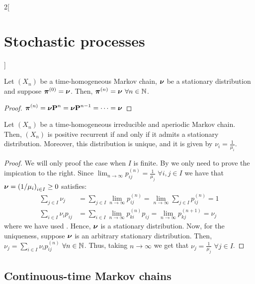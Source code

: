 \documentclass[../../../main_math.tex]{subfiles}
\begin{document}
\begin{multicols}{2}[\section{Stochastic processes}]
\begin{remark}
  \end{remark}
  \begin{lemma}
    Let $(X_n)$ be a time-homogeneous Markov chain, $\boldsymbol{\mathrm{\nu}}$ be a stationary distribution and suppose $\boldsymbol{\mathrm{\pi}}^{(0)}=\boldsymbol{\mathrm{\nu}}$. Then, $\boldsymbol{\mathrm{\pi}}^{(n)}=\boldsymbol{\mathrm{\nu}}$ $\forall n\in\mathbb{N}$.
  \end{lemma}
  \begin{proof}
    $\displaystyle
      \boldsymbol{\mathrm{\pi}}^{(n)}=\boldsymbol{\mathrm{\nu}}\boldsymbol{\mathrm{P}}^n=\boldsymbol{\mathrm{\nu}}\boldsymbol{\mathrm{P}}^{n-1}=\cdots=\boldsymbol{\mathrm{\nu}}
    $
  \end{proof}
  \begin{theorem}
    Let $(X_n)$ be a time-homogeneous irreducible and aperiodic Markov chain. Then, $(X_n)$ is positive recurrent if and only if it admits a stationary distribution. Moreover, this distribution is unique, and it is given by $\nu_i=\frac{1}{\mu_i}$.
  \end{theorem}
  \begin{proof}
    We will only proof the case when $I$ is finite. By  we only need to prove the impication to the right. Since $\displaystyle\lim_{n\to\infty}p_{ij}^{(n)}=\frac{1}{\mu_j}$ $\forall i,j\in I$ we have that $\boldsymbol{\mathrm{\nu}}={(1/\mu_i)}_{i\in I}\geq 0$ satisfies:
    \begin{align*}
      \sum_{j\in I}\nu_j        & =\sum_{j\in I}\lim_{n\to\infty}p_{ij}^{(n)}=\lim_{n\to\infty}\sum_{j\in I}p_{ij}^{(n)}=1 \\
      \sum_{i\in I}\nu_i p_{ij} & =\sum_{i\in I}\lim_{n\to\infty}p_{ki}^{(n)}p_{ij}=\lim_{n\to\infty}p_{kj}^{(n+1)}=\nu_j
    \end{align*}
    where we have used . Hence, $\boldsymbol{\mathrm{\nu}}$ is a stationary distribution. Now, for the uniqueness, suppose $\boldsymbol{\mathrm{\nu}}$ is an arbitrary stationary distribution. Then, $\nu_j=\sum_{i\in I}\nu_i p_{ij}^{(n)}$ $\forall n\in\mathbb{N}$. Thus, taking $n\to\infty$ we get that $\nu_j = \frac{1}{\mu_j}$ $\forall j\in I$.
  \end{proof}
  \subsection{Continuous-time Markov chains}

\end{multicols}
\end{document}
